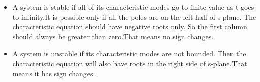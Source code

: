 \begin{enumerate}[label=\thesection.\arabic*.,ref=\thesection.\theenumi]
\begin{itemize}
    \item A system is stable if all of its characteristic modes go to finite value as t goes to infinity.It is possible only if all the poles are on the left half of s plane.
    The characteristic equation should have negative roots only. So the first column should always be greater than zero.That means no sign changes.
    \item A system is unstable if its characteristic modes are not bounded. Then the characteristic equation will also have roots in the right side of s-plane.That means it has sign changes.
    \end{itemize}
\end{enumerate}
